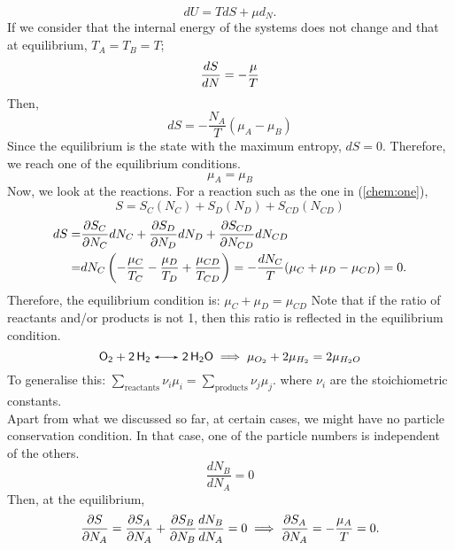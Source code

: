     \begin{equation}
        dU = TdS + \mu d_N.
    \end{equation}
    If we consider that the internal energy of the systems does not change and that at equilibrium, $T_A=T_B=T$;
    \begin{equation}
        \frac{d S}{d N}=-\frac{\mu}{T}
    \end{equation}
    Then,
    \begin{equation}
        dS = - \frac{N_A}{T}(\mu_A-\mu_B)
    \end{equation}
    Since the equilibrium is the state with the maximum entropy, $dS=0$. Therefore, we reach one of the equilibrium conditions.
    \begin{equation}
        \mu_A=\mu_B
    \end{equation}
    Now, we look at the reactions. For a reaction such as the one in (\ref{chem:one}),
    \begin{equation}
        S = S_C(N_C) + S_D(N_D)+S_{CD}(N_{CD})
    \end{equation}
    \begin{align}
        dS =& \frac{\partial S_C}{\partial N_C}dN_C + \frac{\partial S_D}{\partial N_D}dN_D+\frac{\partial S_{CD}}{\partial N_{CD}}dN_{CD}\notag\\
           =& dN_C\left( -\frac{\mu_C}{T_C}-\frac{\mu_D}{T_D}+\frac{\mu_{CD}}{T_{CD}} \right)=-\frac{dN_C}{T}(\mu_C+\mu_D-\mu_{CD})=0.
    \end{align}
    Therefore, the equilibrium condition is: $        \mu_C+\mu_D=\mu_{CD}$
    Note that if the ratio of reactants and/or products is not 1, then this ratio is reflected in the equilibrium condition.
    \begin{equation}
        \ce{O_2 + 2H_2 <-> 2H_2O} \implies \mu_{O_2} + 2\mu_{H_2}=2\mu_{H_2O}
    \end{equation}
    To generalise this: $        \sum_\text{reactants}\nu_i\mu_i = \sum_\text{products}\nu_j\mu_j$. 
    where $\nu_i$ are the stoichiometric constants.\\
    Apart from what we discussed so far, at certain cases, we might have no particle conservation condition. In that case, one of the particle numbers is independent of the others.
    \begin{equation}
        \frac{d N_B}{d N_A} = 0
    \end{equation}
    Then, at the equilibrium,
    \begin{equation}
        \frac{\partial S}{\partial N_A}=\frac{\partial S_A}{\partial N_A}+\frac{\partial S_B}{\partial N_B}\frac{d N_B}{d N_A}=0\implies \frac{\partial S_A}{\partial N_A}=-\frac{\mu_A}{T}=0.
    \end{equation}
